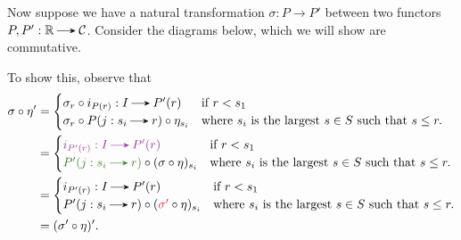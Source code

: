 Now suppose we have a natural transformation $\sigma: P \to P'$ between 
two functors $P, P': \rr \to \cc$.
Consider the diagrams below, which we will show are commutative.
\begin{center}
    \hspace{1cm}
\end{center}
To show this, observe that 
\begin{align*}
    \sigma \circ \eta' 
    &= 
    \begin{cases}
        \sigma_r \circ i_{P(r)}: I \to P'(r) & \text{if } r < s_1\\
        \sigma_{r}\circ P(j: s_i \to r) \circ \eta_{s_i} & \text{where } s_i \text{ is the largest } s \in S \text{ such that } s \le r. 
    \end{cases}\\
    &=
    \begin{cases}
        \textcolor{Purple}{i_{P'(r)}: I \to P'(r)} & \text{if } r < s_1\\
        \textcolor{OliveGreen}{P'(j: s_i \to r)} \circ (\sigma \circ \eta )_{s_i} & \text{where } s_i \text{ is the largest } s \in S \text{ such that } s \le r.
    \end{cases}\\
    &=
    \begin{cases}
        i_{P'(r)}: I \to P'(r) & \text{if } r < s_1\\
        P'(j: s_i \to r) \circ (\textcolor{Red}{\sigma'} \circ \eta )_{s_i} & \text{where } s_i \text{ is the largest } s \in S \text{ such that } s \le r.
    \end{cases}\\
    &= (\sigma' \circ \eta)'.
\end{align*}

